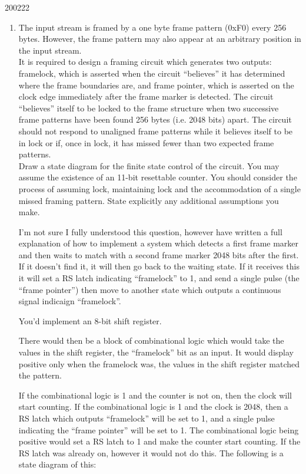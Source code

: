 \documentclass[10pt,\jkfside,a4paper]{article}
\begin{document}
\begin{enumerate}
\begin{examquestion}{2002}{2}{2}
\begin{enumerate}[label=(\alph*)]
\item{The input stream is framed by a one byte frame pattern (0xF0) every 256 bytes.
However, the frame pattern may also appear at an arbitrary position in the
input stream.\\
It is required to design a framing circuit which generates two outputs:
framelock, which is asserted when the circuit ``believes'' it has determined
where the frame boundaries are, and frame pointer, which is asserted on
the clock edge immediately after the frame marker is detected. The circuit
“believes” itself to be locked to the frame structure when two successive frame
patterns have been found 256 bytes (i.e. 2048 bits) apart. The circuit should
not respond to unaligned frame patterns while it believes itself to be in lock
or if, once in lock, it has missed fewer than two expected frame patterns.\\
Draw a state diagram for the finite state control of the circuit. You may assume
the existence of an 11-bit resettable counter. You should consider the process
of assuming lock, maintaining lock and the accommodation of a single missed
framing pattern. State explicitly any additional assumptions you make.}

I'm not sure I fully understood this question, however have written a full 
explanation of how to implement a system which detects a first frame marker
 and then waits to match with a second frame marker 2048 bits after the first. 
 If it doesn't find it, it will then go back to the waiting state.
If it receives this it will set a RS latch indicating ``framelock'' to 1, and 
send a single pulse (the ``frame pointer'') then move to another state which outputs 
a continuous signal indicaign ``framelock''.

You'd implement an 8-bit shift register.

There would then be a block of combinational logic which would take the values in the 
shift register, the ``framelock'' bit as an input. It would display positive only 
when the framelock was, the values in the shift register matched the pattern.

If the combinational logic is 1 and the counter is not on, then the clock will start counting.
If the combinational logic is 1 and the clock is 2048, then a RS latch which outputs ``framelock''
 will be set to 1, and a single pulse indicating the ``frame pointer'' will be set to 1.
The combinational logic being positive would set a RS latch to 1 and make the counter 
start counting.
If the RS latch was already on, however it would not do this.
\newpage
The following is a state diagram of this:


\end{enumerate}
\end{examquestion}
\end{enumerate}
\end{document}
